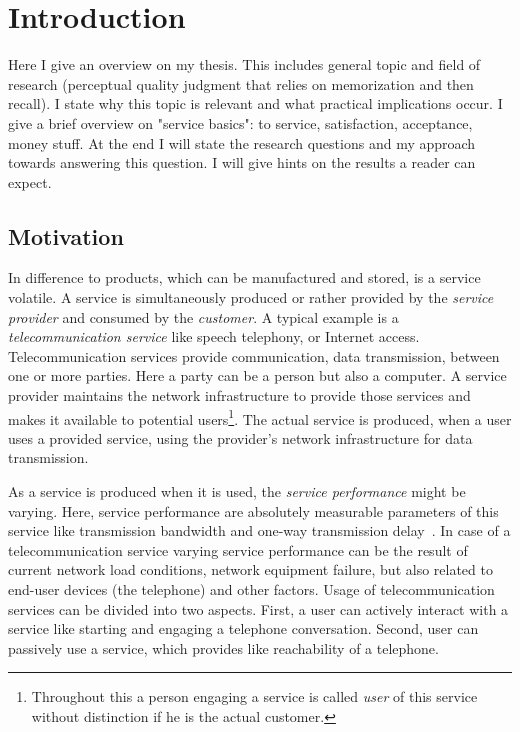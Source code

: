 \chapter{Introduction}\label{chap:01}
\begin{chapter-abstract}
Here I give an overview on my thesis.
This includes general topic and field of research (perceptual quality judgment that relies on memorization and then recall).
I state why this topic is relevant and what practical implications occur.
I give a brief overview on "service basics": to service, satisfaction, acceptance, money stuff.
At the end I will state the research questions and my approach towards answering this question.
I will give hints on the results a reader can expect.
\end{chapter-abstract}

\section{Motivation}
In difference to products, which can be manufactured and stored, is a service volatile.
A service is simultaneously produced or rather provided by the \emph{service provider} and consumed by the \emph{customer}.
A typical example is a \emph{telecommunication service} like speech telephony, or Internet access.
Telecommunication services provide communication, \ie data transmission, between one or more parties.
Here a party can be a person but also a computer.
A service provider maintains the network infrastructure to provide those services and makes it available to potential users\footnote{Throughout this a person engaging a service is called \emph{user} of this service without distinction if he is the actual customer.}.
The actual service is produced, when a user uses a provided service, using the provider's network infrastructure for data transmission.

As a service is produced when it is used, the \emph{service performance} might be varying.
Here, service performance are absolutely measurable parameters of this service like transmission bandwidth and one-way transmission delay~\citep[cf.][p. 12]{moller_assessment_2000}.
In case of a telecommunication service varying service performance can be the result of current network load conditions, network equipment failure, but also related to end-user devices (\eg the telephone) and other factors.
Usage of telecommunication services can be divided into two aspects.
First, a user can actively interact with a service like starting and engaging a telephone conversation.
Second, user can passively use a service, which provides like reachability of a telephone.

